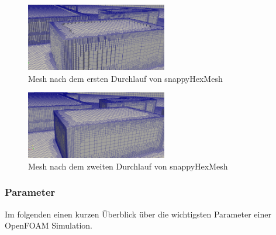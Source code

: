 

\begin{figure}
    \centering
    \includegraphics[width=0.55\textwidth]{papers/openfoam/Bilder/Snappy_grob.png}
    \caption{Mesh nach dem ersten Durchlauf von snappyHexMesh}
    \label{fig:snappygrobbild}
\end{figure}

\begin{figure}
    \centering
    \includegraphics[width=0.55\textwidth]{papers/openfoam/Bilder/Snappy_fein.png}
    \caption{Mesh nach dem zweiten Durchlauf von snappyHexMesh}
    \label{fig:snappyfeinbild}
\end{figure}
\subsubsection{Parameter\label{openfoam:section:Parameter}}
Im folgenden einen kurzen Überblick über die wichtigsten Parameter einer OpenFOAM Simulation.


